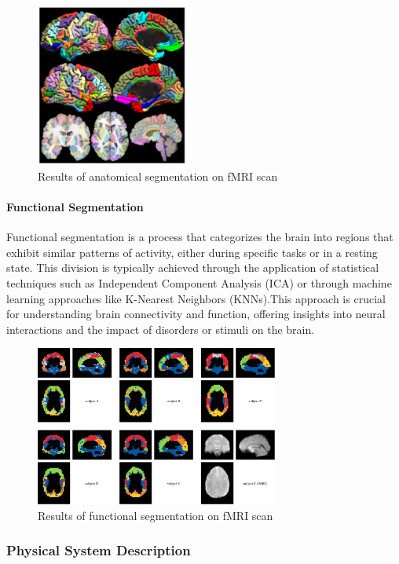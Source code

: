 \documentclass[12pt]{article}
\begin{document}
\begin{figure}[hbpt!]
  \centering
  \includegraphics[width=50mm]{anatomical-seg-fmri.jpg}
  \caption{Results of anatomical segmentation on fMRI scan~\cite{joshi2022hybrid}}
  \label{anatomicalsegfMRI}
\end{figure}

\paragraph*{Functional Segmentation}

Functional segmentation is a process that categorizes the brain into regions
that exhibit similar patterns of activity, either during specific tasks or in a
resting state. This division is typically achieved through the application of
statistical techniques such as Independent Component Analysis (ICA) or through
machine learning approaches like K-Nearest Neighbors (KNNs).This approach is crucial for understanding
brain connectivity and function, offering insights into neural interactions
and the impact of disorders or stimuli on the brain.

\begin{figure}[hbpt!]
  \centering
  \includegraphics[width=80mm]{functional-seg-fmri.png}
  \caption{Results of functional segmentation on fMRI scan~\cite{schmidt2016multivariate}}
  \label{funcsegfMRI}
\end{figure}


\subsubsection{Physical System Description} \label{sec_phySystDescrip}
\end{document}
